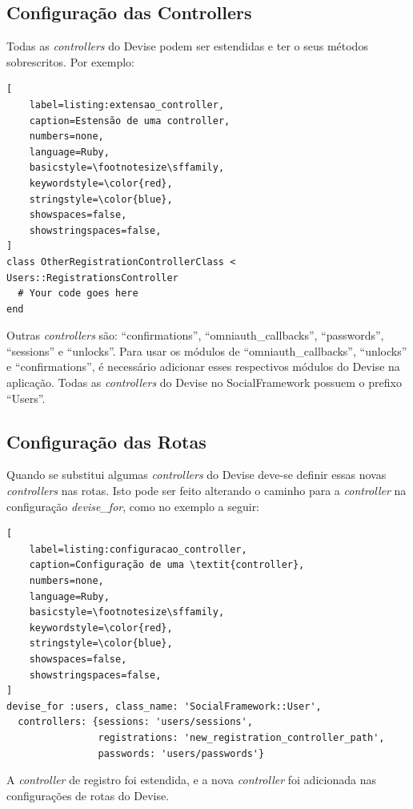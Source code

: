 \subsection{Configuração das Controllers}

Todas as \textit{controllers} do Devise podem ser estendidas e ter o seus métodos sobrescritos. Por exemplo:

\begin{lstlisting}[
    label=listing:extensao_controller,
    caption=Estensão de uma controller,
    numbers=none,
    language=Ruby,
    basicstyle=\footnotesize\sffamily,
    keywordstyle=\color{red},
    stringstyle=\color{blue},
    showspaces=false,
    showstringspaces=false,
]
class OtherRegistrationControllerClass < Users::RegistrationsController
  # Your code goes here
end
\end{lstlisting}

Outras \textit{controllers} são: ``confirmations'', ``omniauth\_callbacks'', ``passwords'', ``sessions'' e ``unlocks''. Para usar os módulos de ``omniauth\_callbacks'', ``unlocks'' e ``confirmations'', é necessário adicionar esses respectivos módulos do Devise na aplicação. Todas as \textit{controllers} do Devise no SocialFramework possuem o prefixo ``Users''.

\subsection{Configuração das Rotas}

Quando se substitui algumas \textit{controllers} do Devise deve-se definir essas novas \textit{controllers} nas rotas. Isto pode ser feito alterando o caminho para a \textit{controller} na configuração \textit{devise\_for}, como no exemplo a seguir:

\begin{lstlisting}[
    label=listing:configuracao_controller,
    caption=Configuração de uma \textit{controller},
    numbers=none,
    language=Ruby,
    basicstyle=\footnotesize\sffamily,
    keywordstyle=\color{red},
    stringstyle=\color{blue},
    showspaces=false,
    showstringspaces=false,
]
devise_for :users, class_name: 'SocialFramework::User',
  controllers: {sessions: 'users/sessions',
                registrations: 'new_registration_controller_path',
                passwords: 'users/passwords'}
\end{lstlisting}

A \textit{controller} de registro foi estendida, e a nova \textit{controller} foi adicionada nas configurações de rotas do Devise.

